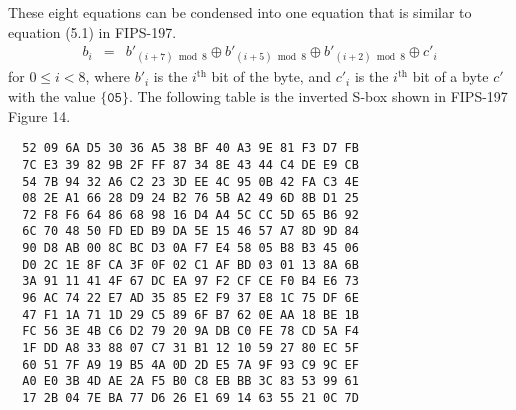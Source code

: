 \documentclass{article}
\newcommand{\gfadd}{\oplus}
\begin{document}
These eight equations can be condensed into one equation
that is similar to equation (5.1) in FIPS-197.
\begin{eqnarray*}
  b_i &=& b'_{(i+7) \bmod 8} \gfadd
          b'_{(i+5) \bmod 8} \gfadd
	  b'_{(i+2) \bmod 8} \gfadd
	  c'_i
\end{eqnarray*}
for $0 \le i < 8$, where $b'_i$ is the $i^{\mathrm{th}}$ bit of the byte,
and $c'_i$ is the $i^{\mathrm{th}}$ bit of a byte $c'$ with the value $\{\mathtt{05}\}$.
The following table is the inverted S-box shown in FIPS-197 Figure 14.
\begin{verbatim}
  52 09 6A D5 30 36 A5 38 BF 40 A3 9E 81 F3 D7 FB
  7C E3 39 82 9B 2F FF 87 34 8E 43 44 C4 DE E9 CB
  54 7B 94 32 A6 C2 23 3D EE 4C 95 0B 42 FA C3 4E
  08 2E A1 66 28 D9 24 B2 76 5B A2 49 6D 8B D1 25
  72 F8 F6 64 86 68 98 16 D4 A4 5C CC 5D 65 B6 92
  6C 70 48 50 FD ED B9 DA 5E 15 46 57 A7 8D 9D 84
  90 D8 AB 00 8C BC D3 0A F7 E4 58 05 B8 B3 45 06
  D0 2C 1E 8F CA 3F 0F 02 C1 AF BD 03 01 13 8A 6B
  3A 91 11 41 4F 67 DC EA 97 F2 CF CE F0 B4 E6 73
  96 AC 74 22 E7 AD 35 85 E2 F9 37 E8 1C 75 DF 6E
  47 F1 1A 71 1D 29 C5 89 6F B7 62 0E AA 18 BE 1B
  FC 56 3E 4B C6 D2 79 20 9A DB C0 FE 78 CD 5A F4
  1F DD A8 33 88 07 C7 31 B1 12 10 59 27 80 EC 5F
  60 51 7F A9 19 B5 4A 0D 2D E5 7A 9F 93 C9 9C EF
  A0 E0 3B 4D AE 2A F5 B0 C8 EB BB 3C 83 53 99 61
  17 2B 04 7E BA 77 D6 26 E1 69 14 63 55 21 0C 7D
\end{verbatim}


\end{document}
